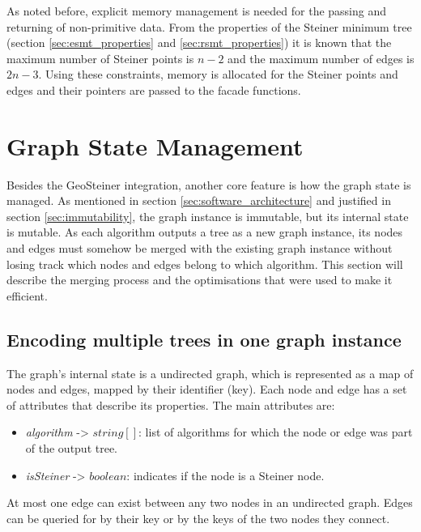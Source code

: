 \documentclass{l4proj}
\begin{document}
As noted before, explicit memory management is needed for the passing and returning of non-primitive data. From the properties of the Steiner minimum tree (section \ref{sec:esmt_properties} and \ref{sec:rsmt_properties}) it is known that the maximum number of Steiner points is $n - 2$ and the maximum number of edges is $2n - 3$. Using these constraints, memory is allocated for the Steiner points and edges and their pointers are passed to the facade functions.

\section{Graph State Management}
\label{sec:graph_state_management}
Besides the GeoSteiner integration, another core feature is how the graph state is managed. As mentioned in section \ref{sec:software_architecture} and justified in section \ref{sec:immutability}, the graph instance is immutable, but its internal state is mutable.
As each algorithm outputs a tree as a new graph instance, its nodes and edges must somehow be merged with the existing graph instance without losing track which nodes and edges belong to which algorithm. This section will describe the merging process and the optimisations that were used to make it efficient.

\subsection{Encoding multiple trees in one graph instance}
The graph's internal state is a undirected graph, which is represented as a map of nodes and edges, mapped by their identifier (key). Each node and edge has a set of attributes that describe its properties. The main attributes are:
\begin{itemize}
    \item \textit{algorithm} -> $string[]$: list of algorithms for which the node or edge was part of the output tree.
    \item \textit{isSteiner} -> $boolean$: indicates if the node is a Steiner node.
\end{itemize}
At most one edge can exist between any two nodes in an undirected graph. Edges can be queried for by their key or by the keys of the two nodes they connect.
\end{document}
